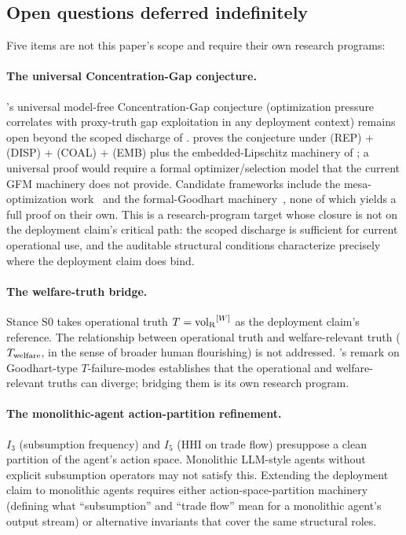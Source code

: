\subsection{Open questions deferred indefinitely}
\label{sec:disc_indefinite}

Five items are not this paper's scope and require their own
research programs:

\paragraph{The universal Concentration-Gap conjecture.}
\citep[Microfoundation]{lasser2026micro}'s universal model-free
Concentration-Gap conjecture (optimization pressure correlates
with proxy-truth gap exploitation in any deployment context)
remains open beyond the scoped discharge of
\citep{lasser2026foundations}.
\citep[Theorem~2]{lasser2026foundations} proves the conjecture
under (REP) + (DISP) + (COAL) + (EMB) plus the embedded-Lipschitz
machinery of \citep[Microfoundation]{lasser2026micro}; a
universal proof would require a formal optimizer/selection model
that the current GFM machinery does not provide.  Candidate
frameworks include the mesa-optimization
work~\citep{hubinger2019risks} and the formal-Goodhart
machinery~\citep{elmhamdi2024goodhart, majka2025strong}, none of
which yields a full proof on their own.  This is a
research-program target whose closure is not on the deployment
claim's critical path: the scoped discharge is sufficient for
current operational use, and the auditable structural conditions
characterize precisely where the deployment claim does bind.

\paragraph{The welfare-truth bridge.}
Stance S0 takes operational truth $T = {\operatorname{vol}_{\mathrm{R}}}^{[W]}$ as the
deployment claim's reference. The relationship between operational
truth and welfare-relevant truth ($T_{\mathrm{welfare}}$, in
the sense of broader human flourishing) is not addressed.
\citep[Microfoundation]{lasser2026micro}'s remark on Goodhart-type
$T$-failure-modes establishes that the operational and
welfare-relevant truths can diverge; bridging them is its own
research program.

\paragraph{The monolithic-agent action-partition refinement.}
$I_3$ (subsumption frequency) and $I_5$ (HHI on trade flow)
presuppose a clean partition of the agent's action space. Monolithic
LLM-style agents without explicit subsumption operators may not
satisfy this. Extending the deployment claim to monolithic agents
requires either action-space-partition machinery (defining what
``subsumption'' and ``trade flow'' mean for a monolithic agent's
output stream) or alternative invariants that cover the same
structural roles.

